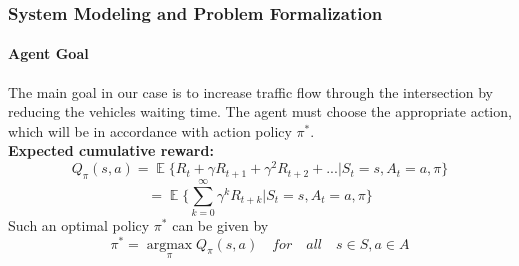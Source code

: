 \documentclass[aspectratio=169]{beamer}
\begin{document}
\begin{frame}
\frametitle{System Modeling and Problem Formalization}
\framesubtitle{Agent Goal}
The main goal in our case is to increase traffic flow through the intersection by reducing the vehicles waiting time. The agent must choose the appropriate action, which will be in accordance with action policy $\pi^*$. \\
\textbf{Expected cumulative reward: }
\begin{equation}
    \label{Eq:6}
    Q_{\pi}(s,a) = \mathop{\mathbb{E}}\{ R_t+\gamma R_{t+1} + \gamma^2R_{t+2}+...|S_t=s,A_t=a,\pi\}
\end{equation}
\begin{equation*}
    = \mathop{\mathbb{E}}\{\sum_{k=0}^{\infty}\gamma^kR_{t+k}|S_t=s,A_t=a,\pi\}
\end{equation*}
Such an optimal policy $\pi^*$ can be given by
\begin{equation}
    \pi^*= \underset{\pi}{\operatorname{argmax}} Q_\pi(s,a) \quad for \quad all \quad s\in S, a \in A
\end{equation}
\end{frame}
\end{document}
